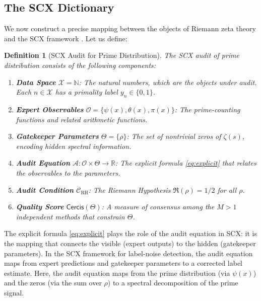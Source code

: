 \documentclass[12pt,a4paper]{article}
\newtheorem{definition}[theorem]{Definition}
\theoremstyle{remark}
\newcommand{\R}{\mathbb{R}}
\newcommand{\N}{\mathbb{N}}
\newcommand{\Obs}{\mathcal{O}}
\newcommand{\A}{\mathcal{A}}
\newcommand{\X}{\mathcal{X}}
\newcommand{\Cercis}{\textsf{Cercis}}
\begin{document}
\subsection{The SCX Dictionary}
\label{sec:dictionary}
We now construct a precise mapping between the objects of Riemann zeta
theory and the SCX framework \cite{SCX2025}. Let us define:
\begin{definition}[SCX Audit for Prime Distribution]
\label{def:scx_audit}
The SCX audit of prime distribution consists of the following components:
\begin{enumerate}
  \item \textbf{Data Space} $\X = \N$: The natural numbers, which are the
        objects under audit. Each $n \in \X$ has a primality label
        $y_n \in \{0,1\}$.
  \item \textbf{Expert Observables} $\Obs = \{\psi(x), \theta(x), \pi(x)\}$:
        The prime-counting functions and related arithmetic functions.
  \item \textbf{Gatekeeper Parameters} $\Theta = \{\rho\}$: The set of
        nontrivial zeros of $\zeta(s)$, encoding hidden spectral information.
  \item \textbf{Audit Equation} $\A: \Obs \times \Theta \to \R$: The
        explicit formula \eqref{eq:explicit} that relates the observables
        to the parameters.
  \item \textbf{Audit Condition} $\mathcal{C}_{\text{RH}}$: The Riemann
        Hypothesis $\Re(\rho) = 1/2$ for all $\rho$.
  \item \textbf{Quality Score} $\Cercis(\Theta)$: A measure of consensus
        among the $M > 1$ independent methods that constrain $\Theta$.
\end{enumerate}
\end{definition}
The explicit formula \eqref{eq:explicit} plays the role of the audit
equation in SCX: it is the mapping that connects the visible (expert outputs)
to the hidden (gatekeeper parameters). In the SCX framework for label-noise
detection, the audit equation maps from expert predictions and gatekeeper
parameters to a corrected label estimate. Here, the audit equation maps from
the prime distribution (via $\psi(x)$) and the zeros (via the sum over
$\rho$) to a spectral decomposition of the prime signal.
\end{document}

